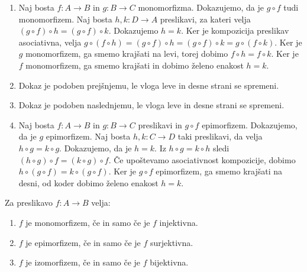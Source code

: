 \begin{dokaz}
  \begin{enumerate}
  \item Naj bosta $f : A \to B$ in $g : B \to C$ monomorfizma. Dokazujemo, da je
    $g \circ f$ tudi monomorfizem. Naj bosta $h, k : D \to A$ preslikavi, za kateri velja
    $(g \circ f) \circ h = (g \circ f) \circ k$. Dokazujemo $h = k$. Ker je kompozicija
    preslikav asociativna, velja
    $g \circ (f \circ h) = (g \circ f) \circ h = (g \circ f) \circ k = g \circ (f \circ k)$.
    Ker je $g$ monomorfizem, ga smemo krajšati na levi, torej dobimo
    $f \circ h = f \circ k$. Ker je $f$ monomorfizem, ga smemo krajšati in dobimo želeno
    enakost $h = k$.

  \item Dokaz je podoben prejšnjemu, le vloga leve in desne strani se spremeni.

  \item Dokaz je podoben naslednjemu, le vloga leve in desne strani se spremeni.

  \item Naj bosta $f : A \to B$ in $g : B \to C$ preslikavi in $g \circ f$ epimorfizem.
    Dokazujemo, da je $g$ epimorfizem. Naj bosta $h, k : C \to D$ taki preslikavi, da
    velja $h \circ g = k \circ g$. Dokazujemo, da je $h = k$. Iz $h \circ g = k \circ h$
    sledi $(h \circ g) \circ f = (k \circ g) \circ f$. Če upoštevamo asociativnost
    kompozicije, dobimo $h \circ (g \circ f) = k \circ (g \circ f)$. Ker je $g \circ f$
    epimorfizem, ga smemo krajšati na desni, od koder dobimo želeno enakost $h = k$.
  \end{enumerate}
\end{dokaz}


\begin{izrek}
  Za preslikavo $f : A \to B$ velja:
  \begin{enumerate}
  \item $f$ je monomorfizem, če in samo če je $f$ injektivna.
  \item $f$ je epimorfizem, če in samo če je $f$ surjektivna.
  \item $f$ je izomorfizem, če in samo če je $f$ bijektivna.
  \end{enumerate}
\end{izrek}


